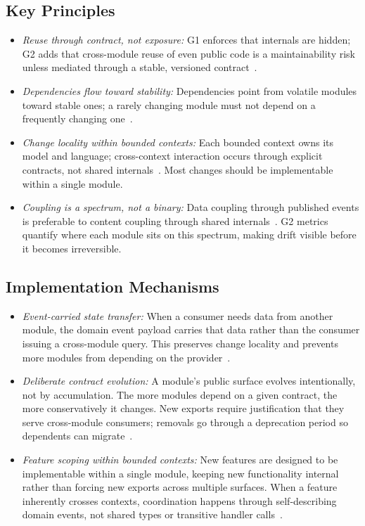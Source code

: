 \subsection*{Key Principles}
\begin{itemize}[itemsep=8pt,topsep=2pt]
  \item \emph{Reuse through contract, not exposure:} G1 enforces that internals are hidden; G2 adds that cross-module reuse of even public code is a maintainability risk unless mediated through a stable, versioned contract~\cite{parnas1972informationhiding}.
  \item \emph{Dependencies flow toward stability:} Dependencies point from volatile modules toward stable ones; a rarely changing module must not depend on a frequently changing one~\cite{martin2012clean}.
  \item \emph{Change locality within bounded contexts:} Each bounded context owns its model and language; cross-context interaction occurs through explicit contracts, not shared internals~\cite{evans2003ddd}. Most changes should be implementable within a single module.
  \item \emph{Coupling is a spectrum, not a binary:} Data coupling through published events is preferable to content coupling through shared internals~\cite{yourdon1979structured,khononov2024balancing}. G2 metrics quantify where each module sits on this spectrum, making drift visible before it becomes irreversible.
\end{itemize}

\subsection*{Implementation Mechanisms}
\begin{itemize}[itemsep=8pt,topsep=2pt]
  \item \emph{Event-carried state transfer:} When a consumer needs data from another module, the domain event payload carries that data rather than the consumer issuing a cross-module query. This preserves change locality and prevents more modules from depending on the provider~\cite{richardson2018microservices}.
  \item \emph{Deliberate contract evolution:} A module's public surface evolves intentionally, not by accumulation. The more modules depend on a given contract, the more conservatively it changes. New exports require justification that they serve cross-module consumers; removals go through a deprecation period so dependents can migrate~\cite{FordParsons2017}.
  \item \emph{Feature scoping within bounded contexts:} New features are designed to be implementable within a single module, keeping new functionality internal rather than forcing new exports across multiple surfaces. When a feature inherently crosses contexts, coordination happens through self-describing domain events, not shared types or transitive handler calls~\cite{evans2003ddd}.
\end{itemize}

